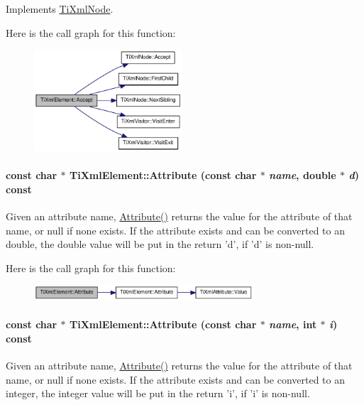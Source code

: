 Implements \hyperlink{class_ti_xml_node_acc0f88b7462c6cb73809d410a4f5bb86}{TiXmlNode}.

Here is the call graph for this function:\nopagebreak
\begin{figure}[H]
\begin{center}
\leavevmode
\includegraphics[width=157pt]{class_ti_xml_element_a31ab28cc3b892a69254391d6bbe08df3_cgraph}
\end{center}
\end{figure}
\hypertarget{class_ti_xml_element_aec4f727f8aa49b51248d80125d173136}{
\paragraph[{Attribute}]{\setlength{\rightskip}{0pt plus 5cm}const char $\ast$ TiXmlElement::Attribute (const char $\ast$ {\em name}, \/  double $\ast$ {\em d}) const}\hfill}
\label{class_ti_xml_element_aec4f727f8aa49b51248d80125d173136}
Given an attribute name, \hyperlink{class_ti_xml_element_ac1e4691e9375ba4e665dce7e46a50a9c}{Attribute()} returns the value for the attribute of that name, or null if none exists. If the attribute exists and can be converted to an double, the double value will be put in the return 'd', if 'd' is non-\/null. 

Here is the call graph for this function:\nopagebreak
\begin{figure}[H]
\begin{center}
\leavevmode
\includegraphics[width=232pt]{class_ti_xml_element_aec4f727f8aa49b51248d80125d173136_cgraph}
\end{center}
\end{figure}
\hypertarget{class_ti_xml_element_aa9192e80567b5042dbded80b78c44339}{
\paragraph[{Attribute}]{\setlength{\rightskip}{0pt plus 5cm}const char $\ast$ TiXmlElement::Attribute (const char $\ast$ {\em name}, \/  int $\ast$ {\em i}) const}\hfill}
\label{class_ti_xml_element_aa9192e80567b5042dbded80b78c44339}
Given an attribute name, \hyperlink{class_ti_xml_element_ac1e4691e9375ba4e665dce7e46a50a9c}{Attribute()} returns the value for the attribute of that name, or null if none exists. If the attribute exists and can be converted to an integer, the integer value will be put in the return 'i', if 'i' is non-\/null. 

